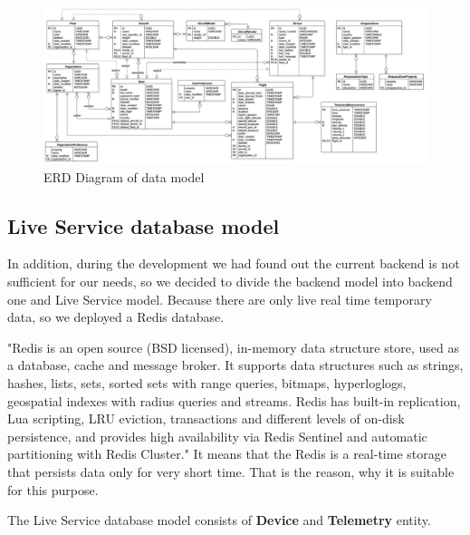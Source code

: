\begin{figure}
    \centering
    \includegraphics[scale=0.31, angle=90]{assets/erd_diagram.png}
    \caption{ERD Diagram of data model\cite{dataModel}}
    \label{fig:erd-diagram}
\end{figure}

\subsection{Live Service database model}\label{subsec:live-service-database-model}
In addition, during the development we had found out the current backend is not sufficient for our needs, so we decided to divide the backend model into backend one and Live Service model.
Because there are only live real time temporary data, so we deployed a Redis database.

"Redis is an open source (BSD licensed), in-memory data structure store, used as a database, cache and message broker.
It supports data structures such as strings, hashes, lists, sets, sorted sets with range queries, bitmaps, hyperloglogs, geospatial indexes with radius queries and streams.
Redis has built-in replication, Lua scripting, LRU eviction, transactions and different levels of on-disk persistence, and provides high availability via Redis Sentinel and automatic partitioning with Redis Cluster."\cite{redis}
It means that the Redis is a real-time storage that persists data only for very short time.
That is the reason, why it is suitable for this purpose.

The Live Service database model consists of \textbf{Device} and \textbf{Telemetry} entity.


